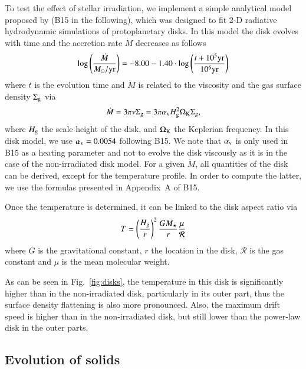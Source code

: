\documentclass{aa}
\begin{document}
To test the effect of stellar irradiation, we implement a simple analytical model proposed by \citet{2015A&A...575A..28B} (B15 in the following), which was designed to fit 2-D radiative hydrodynamic simulations of protoplanetary disks. 
In this model the disk evolves with time and the accretion rate $\dot{M}$ decreases as follows \citep{1998ApJ...495..385H}
\begin{equation}
\log \left( {\dot{M} \over M_\odot / {\rm yr}} \right) = -8.00 -1.40 \cdot \log \left( {t + 10^5 {\rm yr} \over 10^6 {\rm yr}} \right)
\end{equation}
where $t$ is the evolution time and $\dot{M}$ is related to the viscosity and the gas surface density ${\Sigma_{\rm g}}$ via
\begin{equation}
\dot{M} = 3 \pi \nu {\Sigma_{\rm g}} = 3 \pi \alpha_{\rm v} H_{\rm g}^2 \Omega_{\rm K} {\Sigma_{\rm g}},
\end{equation}
where $H_{\rm g}$ the scale height of the disk, and $\Omega_{\rm K}$ the Keplerian frequency. In this disk model, we use $\alpha_{\rm v} = 0.0054$ following B15. We note that $\alpha_{\rm v}$ is only used in B15 as a heating parameter and not to evolve the disk viscously as it is in the case of the non-irradiated disk model. 
For a given $\dot{M}$, all quantities of the disk can be derived, except for the temperature profile. In order 
to compute the latter, we use the formulas presented in Appendix~A of B15.

Once the temperature is determined, it can be linked to the disk aspect ratio via
\begin{equation}
T = \left( { H_{\rm g} \over r } \right)^2 {G M_\star \over r } {\mu \over \mathcal{R}}
\end{equation}
where $G$ is the gravitational constant, $r$ the location in the disk, $\mathcal{R}$ is the gas constant and $\mu$ is the mean molecular weight. 

As can be seen in Fig.~\ref{fig:disks}, the temperature in this disk is significantly higher than in the non-irradiated disk, particularly in its outer part, thus the surface density flattening is also more pronounced. Also, the maximum drift speed is higher than in the non-irradiated disk, but still lower than the power-law disk in the outer parts. 

\subsection{Evolution of solids}
\end{document}
